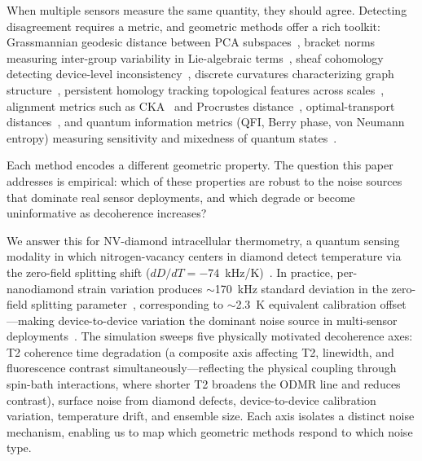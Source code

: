 \documentclass[11pt]{article}
\begin{document}
When multiple sensors measure the same quantity, they should agree.
Detecting disagreement requires a metric, and geometric methods offer a
rich toolkit: Grassmannian geodesic distance between PCA
subspaces~\citep{edelman1998geometry,ye2016schubert,bendokat2024grassmann}, bracket norms
measuring inter-group variability in Lie-algebraic
terms~\citep{tower2026bracket}, sheaf cohomology
detecting device-level
inconsistency~\citep{hansen2019toward,robinson2014topological,curry2014sheaves},
discrete curvatures characterizing graph
structure~\citep{ollivier2009ricci,forman2003bochner},
persistent homology tracking topological features across
scales~\citep{carlsson2009topology,edelsbrunner2010computational,zomorodian2005computing},
alignment metrics such as CKA~\citep{kornblith2019similarity} and
Procrustes distance~\citep{gower2004procrustes},
optimal-transport distances~\citep{villani2009optimal,peyre2019computational},
and quantum information metrics (QFI, Berry phase, von Neumann entropy)
measuring sensitivity and mixedness of quantum
states~\citep{braunstein1994statistical,berry1984quantal,neumann1955mathematical,toth2014quantum}.

Each method encodes a different geometric property.  The question this
paper addresses is empirical: which of these properties are robust to
the noise sources that dominate real sensor deployments, and which
degrade or become uninformative as decoherence increases?

We answer this for NV-diamond intracellular thermometry, a quantum
sensing modality in which nitrogen-vacancy centers in diamond detect
temperature via the zero-field splitting shift ($dD/dT =
-74$~kHz/K)~\citep{kucsko2013nanometre,doherty2013nitrogen,schirhagl2014nitrogen}.
In practice, per-nanodiamond strain variation produces $\sim$170~kHz
standard deviation in the zero-field splitting
parameter~\citep{fujiwara2024fluorescent}, corresponding to
$\sim$2.3~K equivalent calibration offset---making device-to-device
variation the dominant noise source in multi-sensor
deployments~\citep{sekiguchi2023simultaneous,rajpal2025evaluating}.
The simulation sweeps five physically motivated decoherence axes: T2
coherence time degradation (a composite axis affecting T2, linewidth,
and fluorescence contrast simultaneously---reflecting the physical
coupling through spin-bath interactions, where shorter T2 broadens
the ODMR line and reduces contrast), surface noise from diamond
defects, device-to-device calibration variation, temperature drift, and
ensemble size.  Each axis isolates a distinct noise mechanism, enabling
us to map which geometric methods respond to which noise type.
\end{document}
